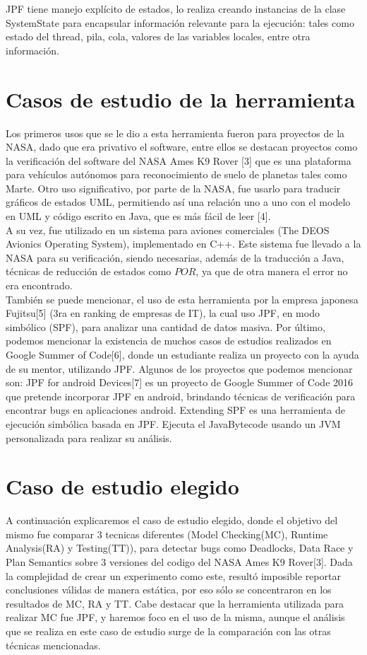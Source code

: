 \documentclass[runningheads]{llncs}
\begin{document}
JPF tiene manejo expl\'icito de estados, lo realiza creando instancias de la clase SystemState para encapsular informaci\'on relevante para la ejecuci\'on: tales como estado del thread, pila, cola, valores de las variables locales, entre otra informaci\'on.


\section{Casos de estudio de la herramienta}

Los primeros usos que se le dio a esta herramienta fueron para proyectos de la NASA, dado que era privativo el software, entre ellos se destacan proyectos como la verificaci\'on del software del NASA Ames K9 Rover [3] que es una plataforma para veh\'iculos aut\'onomos para reconocimiento de suelo de planetas tales como Marte.
Otro uso significativo, por parte de la NASA, fue usarlo para traducir gr\'aficos de estados UML, permitiendo as\'i una relaci\'on uno a uno con el modelo en UML y c\'odigo escrito en Java, que es m\'as f\'acil de leer [4].\\
A su vez, fue utilizado en un sistema para aviones comerciales (The DEOS Avionics Operating System), implementado en C++. Este sistema fue llevado a la NASA para su verificaci\'on, siendo necesarias, adem\'as de la traducci\'on a Java, t\'ecnicas de reducci\'on de estados como $POR$, ya que de otra manera el error no era encontrado.\\
Tambi\'en se puede mencionar, el uso de esta herramienta por la empresa japonesa Fujitsu[5] (3ra en ranking de empresas de IT), la cual uso JPF, en modo simb\'olico (SPF), para analizar una cantidad de datos masiva.
Por \'ultimo, podemos mencionar la existencia de muchos casos de estudios realizados en Google Summer of Code[6], donde un estudiante realiza un proyecto con la ayuda de su mentor, utilizando JPF. Algunos de los proyectos que podemos mencionar son: 
JPF for android Devices[7] es un proyecto de Google Summer of Code 2016 que pretende incorporar JPF en android, brindando t\'ecnicas de verificaci\'on para encontrar bugs en aplicaciones android.
Extending SPF es una herramienta de ejecuci\'on simb\'olica basada en JPF. Ejecuta el JavaBytecode usando un JVM personalizada para realizar su an\'alisis.


\section{Caso de estudio elegido}
A continuaci\'on explicaremos el caso de estudio elegido, donde el objetivo del mismo fue comparar 3 tecnicas diferentes (Model Checking(MC), Runtime Analysis(RA) y Testing(TT)), para detectar bugs como Deadlocks, Data Race y Plan Semantics sobre 3 versiones del codigo del NASA Ames K9 Rover[3].
Dada la complejidad de crear un experimento como este, result\'o imposible reportar conclusiones v\'alidas de manera est\'atica, por eso s\'olo se concentraron en los resultados de MC, RA y TT. Cabe destacar que la herramienta utilizada para realizar MC fue JPF, y haremos foco en el uso de la misma, aunque el an\'alisis que se realiza en este caso de estudio surge de la comparaci\'on con las otras t\'ecnicas mencionadas.
\end{document}
